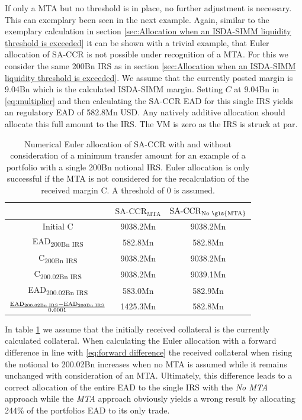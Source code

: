 \documentclass[../Thesis_AHoecherl.tex]{subfiles}
\begin{document}
    If only a MTA but no threshold is in place, no further adjustment is necessary.
    This can exemplary been seen in the next example.
    Again, similar to the exemplary calculation in section \ref{sec:Allocation when an ISDA-SIMM liquidity threshold is exceeded} it can be shown with a trivial example, that Euler allocation of SA-CCR is not possible under recognition of a \gls{MTA}. 
    For this we consider the same 200Bn \gls{IRS} as in section \ref{sec:Allocation when an ISDA-SIMM liquidity threshold is exceeded}. We assume that the currently posted margin is 9.04Bn which is the calculated ISDA-SIMM margin. 
    Setting $C$ at 9.04Bn in \ref{eq:multiplier} and then calculating the SA-CCR EAD for this single IRS  yields an regulatory EAD of 582.8Mn USD. Any natively additive allocation should allocate this full amount to the IRS.
    The \gls{VM} is zero as the IRS is struck at par.
    \begin{table}[htbp]
        \label{tab:Allocate SA-CCR with MTA calculation}
        \centering
            \begin{tabular}{c|c|c}
                & $\text{SA-CCR}_{\text{MTA}}$ & $\text{SA-CCR}_{\text{No \gls{MTA}}}$ \\
                \toprule
                Initial C & 9038.2Mn & 9038.2Mn \\
                \midrule
                EAD\textsubscript{200Bn IRS} & 582.8Mn & 582.8Mn \\
                \midrule
                C\textsubscript{200Bn IRS} & 9038.2Mn & 9038.2Mn \\
                \midrule
                C\textsubscript{200.02Bn IRS} & 9038.2Mn & 9039.1Mn \\
                \midrule
                EAD\textsubscript{200.02Bn IRS} & 583.0Mn & 582.9Mn \\
                \midrule
                $\frac{\text{EAD\textsubscript{200.02Bn IRS}}-\text{EAD\textsubscript{200Bn IRS}}}{0.0001}$ & 1425.3Mn & 582.8Mn  \\
            \end{tabular}%
        \caption{Numerical Euler allocation of SA-CCR with and without consideration of a minimum transfer amount for an example of a portfolio with a single 200Bn notional IRS. Euler allocation is only successful if the \gls{MTA} is not considered for the recalculation of the received margin C. A threshold of 0 is assumed.}
    \end{table}
    In table \ref{tab:Allocate SA-CCR with MTA calculation} we assume that the initially received collateral is the currently calculated collateral. 
    When calculating the Euler allocation with a forward difference in line with \ref{eq:forward difference} the received collateral when rising the notional to 200.02Bn increases when no MTA is assumed while it remains unchanged with consideration of an MTA. 
    Ultimately, this difference leads to a correct allocation of the entire EAD to the single IRS with the \emph{No MTA} approach while the \emph{MTA} approach obviously yields a wrong result by allocating 244\% of the portfolios EAD to its only trade.
\end{document}
